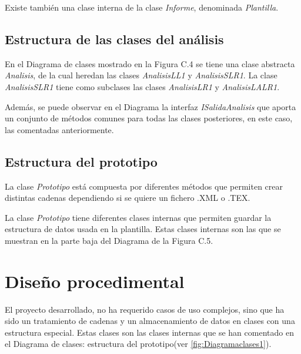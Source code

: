 Existe también una clase interna de la clase \textit{Informe}, denominada \textit{Plantilla}.
\vspace{0.5cm}
\newpage
\subsection{Estructura de las clases del análisis}

En el Diagrama de clases mostrado en la Figura C.4 se tiene una clase abstracta \textit{Analisis}, de la cual heredan las clases \textit{AnalisisLL1} y \textit{AnalisisSLR1}. La clase \textit{AnalisisSLR1} tiene como subclases las clases \textit{AnalisisLR1} y \textit{AnalisisLALR1}.

Además, se puede observar en el Diagrama la interfaz \textit{ISalidaAnalisis} que aporta un conjunto de métodos comunes para todas las clases posteriores, en este caso, las comentadas anteriormente.
\vspace{0.5cm}
\newpage
\subsection{Estructura del prototipo}

La clase \textit{Prototipo} está compuesta por diferentes métodos que permiten crear distintas cadenas dependiendo si se quiere un fichero .XML o .TEX.

La clase \textit{Prototipo} tiene diferentes clases internas que permiten guardar la estructura de datos usada en la plantilla. Estas clases internas son las que se muestran en la parte baja del Diagrama de la Figura C.5.
\vspace{0.5cm}

\section{Diseño procedimental}



El proyecto desarrollado, no ha requerido casos de uso complejos, sino que ha sido un tratamiento de cadenas y un almacenamiento de datos en clases con una estructura especial. Estas clases son las clases internas que se han comentado en el Diagrama de clases: estructura del prototipo(ver \ref{fig:Diagramaclases1}).

